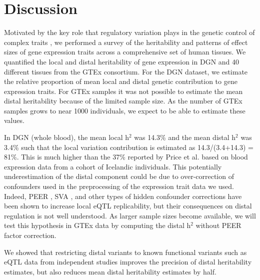\documentclass[10pt,letterpaper]{article}
\begin{document}
\section*{Discussion}
Motivated by the key role that regulatory variation plays in the genetic control of complex traits \cite{Nicolae_2010,Nica_2010,Gusev_2014}, we performed a survey of the heritability and patterns of effect sizes of gene expression traits across a comprehensive set of human tissues. We quantified the local and distal heritability of gene expression in DGN and 40 different tissues from the GTEx consortium. For the DGN dataset, we estimate the relative proportion of mean local and distal genetic contribution to gene expression traits. For GTEx samples it was not possible to estimate the mean distal heritability because of the limited sample size. As the number of GTEx samples grows to near 1000 individuals, we expect to be able to estimate these values.

In DGN (whole blood), the mean local h$^2$ was 14.3\% and the mean distal h$^2$ was 3.4\% such that the local variation contribution is estimated as 14.3/(3.4+14.3) = 81\%. This is much higher than the 37\% reported by Price et al. \cite{Price_2011} based on blood expression data from a cohort of Icelandic individuals. This potentially underestimation of the distal component could be due to over-correction of confounders used in the preprocessing of the expression trait data we used. Indeed, PEER \cite{Stegle_2012}, SVA \cite{Leek_2007}, and other types of hidden confounder corrections have been shown to increase local eQTL replicability, but their consequences on distal regulation is not well understood.  As larger sample sizes become available, we will test this hypothesis in GTEx data by computing the distal h$^2$ without PEER factor correction.


We showed that restricting distal variants to known functional variants such as eQTL data from independent studies improves the precision of distal heritability estimates, but also reduces mean distal heritability estimates by half. %
\end{document}
